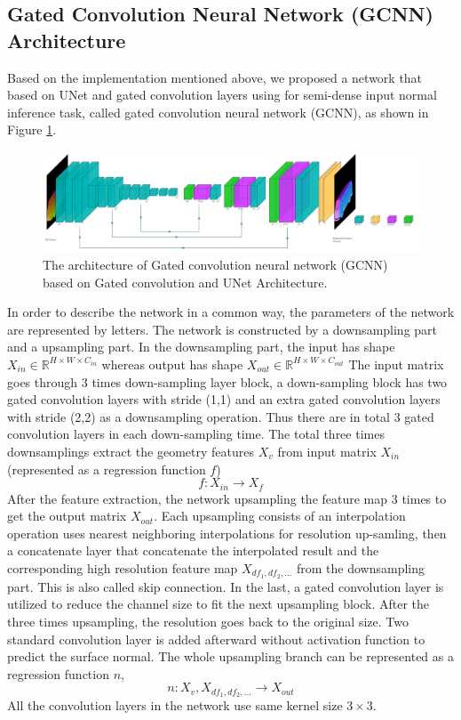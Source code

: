 \subsection{Gated Convolution Neural Network (GCNN) Architecture}
\label{sec:architecture}

Based on the implementation mentioned above, we proposed a network that based on UNet \cite{unet} and gated convolution layers using for semi-dense input normal inference task, called gated convolution neural network (GCNN), as shown in Figure \ref{fig:gcnn-archi}. 


\begin{figure}
	\centering
	\includegraphics[width=1\textwidth]{Figures/gcnn}
	\caption{The architecture of Gated convolution neural network (GCNN) based on Gated convolution and UNet Architecture.}
	\label{fig:gcnn-archi}
\end{figure}

In order to describe the network in a common way, the parameters of the network are represented by letters.
The network is constructed by a downsampling part and a upsampling part. In the downsampling part, the input has shape $ X_{in} \in \mathbb{R}^{H\times W\times C_{in}}$ whereas output has shape $ X_{out} \in \mathbb{R}^{H\times W\times C_{out}}$
The input matrix goes through 3 times down-sampling layer block, a down-sampling block has two gated convolution layers with stride (1,1) and an extra gated convolution layers with stride (2,2) as a downsampling operation. Thus there are in total 3 gated convolution layers in each down-sampling time.
The total three times downsamplings extract the geometry features $ X_v $ from input matrix $ X_{in} $ (represented as a regression function $ f $)
\[ f: X_{in} \rightarrow X_f \]
After the feature extraction, the network upsampling the feature map 3 times to get the output matrix $ X_{out} $. Each upsampling consists of an interpolation operation uses nearest neighboring interpolations for resolution up-samling, then a concatenate layer that concatenate the interpolated result and the corresponding high resolution feature map  $ X_{df_1, df_2, ...} $  from the downsampling part. This is also called skip connection. In the last, a gated convolution layer is utilized to reduce the channel size to fit the next upsampling block. After the three times upsampling, the resolution goes back to the original size. Two standard convolution layer is added afterward without activation function to predict the surface normal. The whole upsampling branch can be represented as a regression function $ n $,
\[ n: X_v, X_{df_1, df_2, ...} \rightarrow X_{out} \]
All the convolution layers in the network use same kernel size $ 3\times 3 $. 

